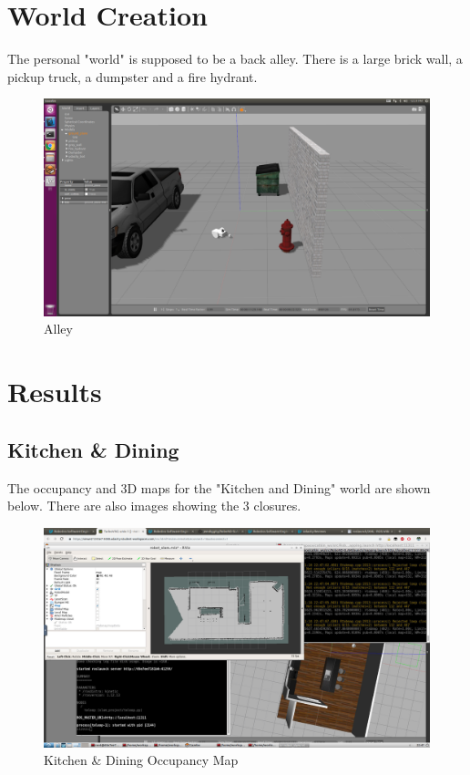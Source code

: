 \documentclass[10pt,journal,compsoc]{IEEEtran}
\begin{document}
\section{World Creation}
The personal "world" is supposed to be a back alley. There is a large brick wall, a pickup truck, a dumpster and a fire hydrant.

\begin{figure}[thpb]
    \centering
    \includegraphics[width=\linewidth]{alley_no_cone}
    \caption{Alley}
    \label{fig:alley}
\end{figure}

\section{Results}

\subsection{Kitchen \& Dining}

The occupancy and 3D maps for the "Kitchen and Dining" world are shown below. There are also images showing the 3 closures.

\begin{figure}[thpb]
    \centering
    \includegraphics[width=\linewidth]{dining_map}
    \caption{Kitchen \& Dining Occupancy Map}
    \label{fig:dining_2d}
\end{figure}
\end{document}
